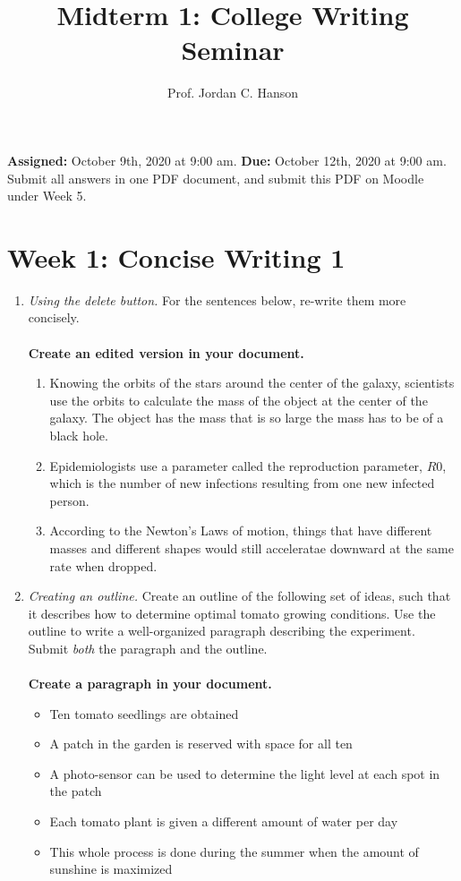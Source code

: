 \documentclass{article}
\begin{document}
\title{Midterm 1: College Writing Seminar}
\author{Prof. Jordan C. Hanson}

\maketitle

\textbf{Assigned:} October 9th, 2020 at 9:00 am.  \textbf{Due:} October 12th, 2020 at 9:00 am. Submit all answers in one PDF document, and submit this PDF on Moodle under Week 5.

\section{Week 1: Concise Writing 1}

\begin{enumerate}
\item \textit{Using the delete button.} For the sentences below, re-write them more concisely. \\ \\
\textbf{Create an edited version in your document.}
\begin{enumerate}
\item Knowing the orbits of the stars around the center of the galaxy, scientists use the orbits to calculate the mass of the object at the center of the galaxy.  The object has the mass that is so large the mass has to be of a black hole.
\item Epidemiologists use a parameter called the reproduction parameter, $R0$, which is the number of new infections resulting from one new infected person.
\item According to the Newton's Laws of motion, things that have different masses and different shapes would still acceleratae downward at the same rate when dropped.
\end{enumerate}
\item \textit{Creating an outline.} Create an outline of the following set of ideas, such that it describes how to determine optimal tomato growing conditions.  Use the outline to write a well-organized paragraph describing the experiment. Submit \textit{both} the paragraph and the outline.  \\ \\
\textbf{Create a paragraph in your document.} 
\begin{itemize}
\item Ten tomato seedlings are obtained
\item A patch in the garden is reserved with space for all ten
\item A photo-sensor can be used to determine the light level at each spot in the patch
\item Each tomato plant is given a different amount of water per day
\item This whole process is done during the summer when the amount of sunshine is maximized
\end{itemize}
\end{enumerate}
\end{document}
